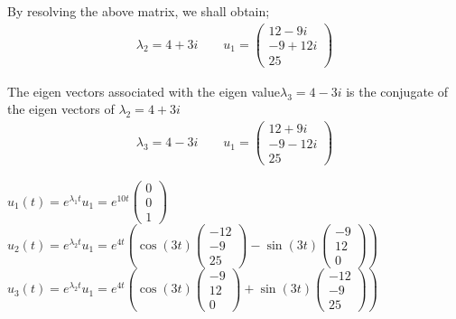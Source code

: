 \documentclass[12pt,a4paper]{article}
\begin{document}
\begin{itemize}
\begin{itemize}
By resolving the above matrix, we shall obtain;
\begin{align*}
\lambda_{2}=4+3i\quad \quad u_{1}=
\begin{pmatrix} 12-9i \\ -9+12i \\25 \end{pmatrix}
\end{align*}

The eigen vectors associated with the eigen value$\lambda_{3}=4-3i$ is the conjugate of the eigen vectors of  $\lambda_{2}=4+3i$\\
\begin{align*}
\lambda_{3}=4-3i\quad \quad u_{1}=
\begin{pmatrix} 12+9i \\ -9-12i \\25 \end{pmatrix}
\end{align*}

$u_{1}(t)=e^{\lambda_{1}t}u_{1}=e^{10t}\begin{pmatrix} 0 \\ 0 \\1 \end{pmatrix}$\\
$u_{2}(t)=e^{\lambda_{2}t}u_{1}=e^{4t}\left(\cos\left(3t\right)\begin{pmatrix} -12 \\ -9 \\25\end{pmatrix}-\sin\left(3t\right)\begin{pmatrix} -9 \\ 12 \\0\end{pmatrix}\right)$\\
$u_{3}(t)=e^{\lambda_{2}t}u_{1}=e^{4t}\left(\cos\left(3t\right)\begin{pmatrix} -9 \\ 12 \\0\end{pmatrix}+\sin\left(3t\right)\begin{pmatrix} -12 \\ -9 \\25\end{pmatrix}\right)$


\end{itemize}
\end{itemize}
\end{document}
